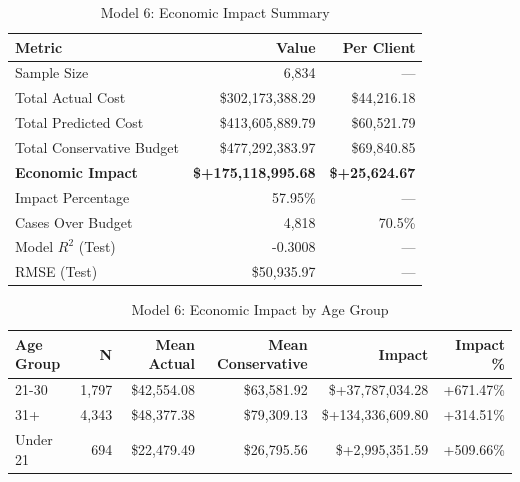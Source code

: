 \begin{table}[htbp]
\centering
\small
\caption{Model 6: Economic Impact Summary}
\label{tab:model6_impact_summary}
\begin{tabular}{lrr}
\toprule
\textbf{Metric} & \textbf{Value} & \textbf{Per Client} \\
\midrule
Sample Size & 6,834 & --- \\
\midrule
Total Actual Cost & \$302,173,388.29 & \$44,216.18 \\
Total Predicted Cost & \$413,605,889.79 & \$60,521.79 \\
Total Conservative Budget & \$477,292,383.97 & \$69,840.85 \\
\midrule
\textbf{Economic Impact} & \textbf{\$+175,118,995.68} & \textbf{\$+25,624.67} \\
Impact Percentage & 57.95\% & --- \\
\midrule
Cases Over Budget & 4,818 & 70.5\% \\
\midrule
Model $R^2$ (Test) & -0.3008 & --- \\
RMSE (Test) & \$50,935.97 & --- \\
\bottomrule
\end{tabular}
\end{table}

\begin{table}[htbp]
\centering
\small
\caption{Model 6: Economic Impact by Age Group}
\label{tab:model6_impact_age}
\begin{tabular}{lrrrrr}
\toprule
\textbf{Age Group} & \textbf{N} & \textbf{Mean Actual} & \textbf{Mean Conservative} & \textbf{Impact} & \textbf{Impact \%} \\
\midrule
21-30 & 1,797 & \$42,554.08 & \$63,581.92 & \$+37,787,034.28 & +671.47\% \\
31+ & 4,343 & \$48,377.38 & \$79,309.13 & \$+134,336,609.80 & +314.51\% \\
Under 21 & 694 & \$22,479.49 & \$26,795.56 & \$+2,995,351.59 & +509.66\% \\
\bottomrule
\end{tabular}
\end{table}

